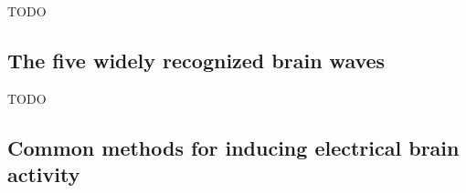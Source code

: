 TODO


\subsection{The five widely recognized brain waves}
\label{subsec:biomedical_signals_working_with_eeg_brain_waves}

TODO


\subsection{Common methods for inducing electrical brain activity}
\label{subsec:biomedical_signals_working_with_eeg_inducing_methods}




